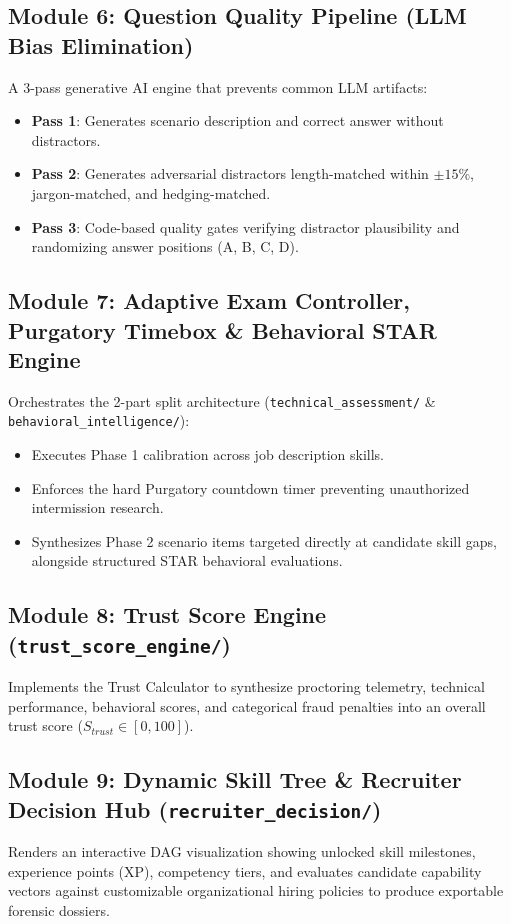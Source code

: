\subsection{Module 6: Question Quality Pipeline (LLM Bias Elimination)}
A 3-pass generative AI engine that prevents common LLM artifacts:
\begin{itemize}
    \item \textbf{Pass 1}: Generates scenario description and correct answer without distractors.
    \item \textbf{Pass 2}: Generates adversarial distractors length-matched within $\pm 15\%$, jargon-matched, and hedging-matched.
    \item \textbf{Pass 3}: Code-based quality gates verifying distractor plausibility and randomizing answer positions (A, B, C, D).
\end{itemize}

\subsection{Module 7: Adaptive Exam Controller, Purgatory Timebox \& Behavioral STAR Engine}
Orchestrates the 2-part split architecture (\texttt{technical\_assessment/} \& \texttt{behavioral\_intelligence/}):
\begin{itemize}
    \item Executes Phase 1 calibration across job description skills.
    \item Enforces the hard Purgatory countdown timer preventing unauthorized intermission research.
    \item Synthesizes Phase 2 scenario items targeted directly at candidate skill gaps, alongside structured STAR behavioral evaluations.
\end{itemize}

\subsection{Module 8: Trust Score Engine (\texttt{trust\_score\_engine/})}
Implements the Trust Calculator to synthesize proctoring telemetry, technical performance, behavioral scores, and categorical fraud penalties into an overall trust score ($S_{trust} \in [0, 100]$).

\subsection{Module 9: Dynamic Skill Tree \& Recruiter Decision Hub (\texttt{recruiter\_decision/})}
Renders an interactive DAG visualization showing unlocked skill milestones, experience points (XP), competency tiers, and evaluates candidate capability vectors against customizable organizational hiring policies to produce exportable forensic dossiers.


